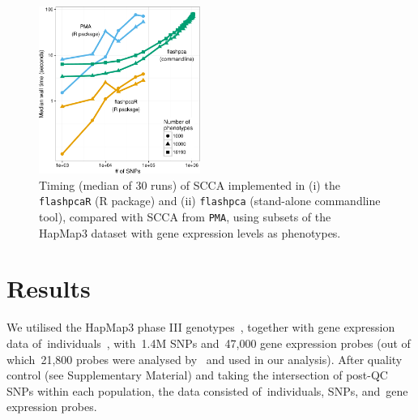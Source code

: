 \documentclass{bioinfo}
\begin{document}
\begin{figure}[!tpb]
\centerline{\includegraphics[width=0.47\textwidth]{scca_timing-crop.pdf}}
\caption{
Timing (median of 30 runs) of SCCA implemented in (i) the \texttt{flashpcaR}
(\textsf{R} package) and (ii) \texttt{flashpca} (stand-alone commandline tool),
compared with SCCA from \texttt{PMA}, using subsets of the HapMap3 dataset with gene
expression levels as phenotypes.
}
\label{fig:01}
\end{figure}

\section{Results}

We utilised the HapMap3 phase III genotypes~\citep{hapmap2010}, together with
gene expression data of~\nindiv individuals~\citep{Stranger2012}, with~1.4M
SNPs and~47,000 gene expression probes (out of which~21,800 probes were
analysed by~\citet{Stranger2012} and used in our analysis). After quality
control (see Supplementary Material) and taking the intersection of post-QC
SNPs within each population, the data consisted of~\nindiv individuals,
\nsnps SNPs, and~\ngenes gene expression probes.
\end{document}
